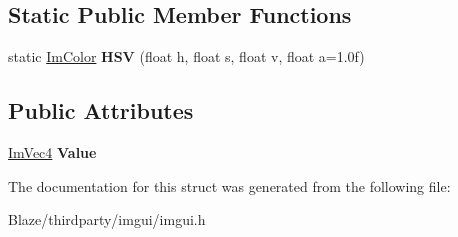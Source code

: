 \subsection*{Static Public Member Functions}
\begin{DoxyCompactItemize}
\item 
\mbox{\label{structImColor_ac8cb52119648523038818a613becf010}} 
static \hyperlink{structImColor}{Im\+Color} {\bfseries H\+SV} (float h, float s, float v, float a=1.\+0f)
\end{DoxyCompactItemize}
\subsection*{Public Attributes}
\begin{DoxyCompactItemize}
\item 
\mbox{\label{structImColor_a4cf43bd58e30decaa0248f839fc85e95}} 
\hyperlink{structImVec4}{Im\+Vec4} {\bfseries Value}
\end{DoxyCompactItemize}


The documentation for this struct was generated from the following file\+:\begin{DoxyCompactItemize}
\item 
Blaze/thirdparty/imgui/imgui.\+h\end{DoxyCompactItemize}
